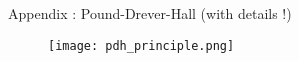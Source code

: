 \begin{frame}[noframenumbering]{Appendix : Pound-Drever-Hall (with details !)}
	\begin{figure}
		\centering
		\texttt{[image: pdh\_principle.png]}
	\end{figure}
\end{frame}